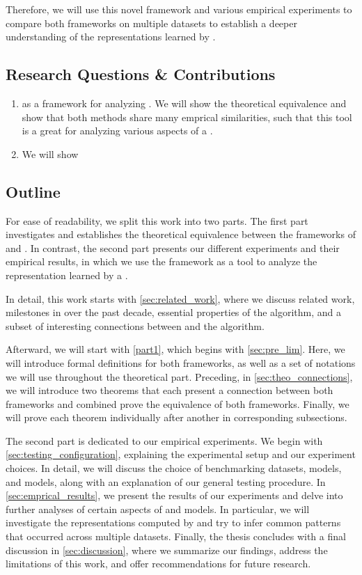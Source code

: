 Therefore, we will use this novel framework and various empirical experiments to compare both frameworks on multiple datasets to establish a deeper understanding of the representations learned by \gnns.

\subsection{Research Questions \& Contributions}
\begin{enumerate}
   \item \wlnn as a framework for analyzing \gnns. We will show the theoretical equivalence and show that both methods share many emprical similarities, such that this tool is a great for analyzing various aspects of a \gnn.
   \item We will show
\end{enumerate}

\subsection{Outline}
For ease of readability, we split this work into two parts. The first part investigates and establishes the theoretical equivalence between the frameworks of \wlnn and \gnns. In contrast, the second part presents our different experiments and their empirical results, in which we use the \wlnn framework as a tool to analyze the representation learned by a \gnn.

In detail, this work starts with \cref{sec:related_work}, where we discuss related work, milestones in \gnns over the past decade, essential properties of the \wl algorithm, and a subset of interesting connections between \gnns and the \wl algorithm.

Afterward, we will start with \cref{part1}, which begins with \cref{sec:pre_lim}. Here, we will introduce formal definitions for both frameworks, as well as a set of notations we will use throughout the theoretical part. Preceding, in \cref{sec:theo_connections}, we will introduce two theorems that each present a connection between both frameworks and combined prove the equivalence of both frameworks. Finally, we will prove each theorem individually after another in corresponding subsections.

The second part is dedicated to our empirical experiments. We begin with \cref{sec:testing_configuration}, explaining the experimental setup and our experiment choices. In detail, we will discuss the choice of benchmarking datasets, \gnn models, and \wlnn models, along with an explanation of our general testing procedure. In \cref{sec:emprical_results}, we present the results of our experiments and delve into further analyses of certain aspects of \gnn and \wlnn models. In particular, we will investigate the representations computed by \gnns and try to infer common patterns that occurred across multiple datasets. Finally, the thesis concludes with a final discussion in \cref{sec:discussion}, where we summarize our findings, address the limitations of this work, and offer recommendations for future research.